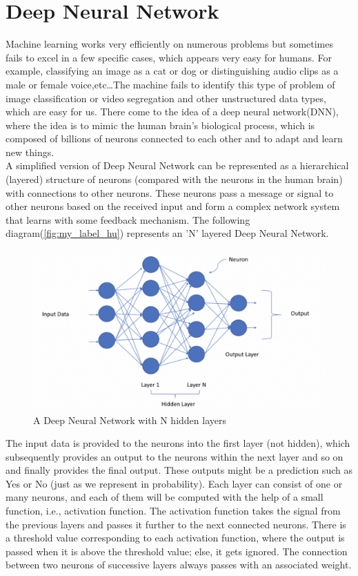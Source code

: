 \section{Deep Neural Network}
Machine learning works very efficiently on numerous problems but sometimes fails to excel in a few specific cases, which appears very easy for humans. For example, classifying an image as a cat or dog or distinguishing audio clips as a male or female voice,etc\dots The machine fails to identify this type of problem of image classification or video segregation and other unstructured data types, which are easy for us. There come to the idea of a deep neural network(DNN), where the idea is to mimic the human brain's biological process, which is composed of billions of neurons connected to each other and to adapt and learn new things\cite{LeCun2015}. \\ 


A simplified version of Deep Neural Network can be represented as a hierarchical (layered) structure of neurons (compared with the neurons in the human brain) with connections to other neurons. These neurons pass a message or signal to other neurons based on the received input and form a complex network system that learns with some feedback mechanism. The following diagram(\autoref{fig:my_label_hu}) represents an 'N' layered Deep Neural Network.\\

\begin{figure}[H]
    \centering
    \includegraphics[scale=0.4]{Figure/1_ML_report.png}
    \caption{A Deep Neural Network with N hidden layers}
    \label{fig:my_label_hu}
\end{figure}
The input data is provided to the neurons into the first layer (not hidden), which subsequently provides an output to the neurons within the next layer and so on and finally provides the final output. These outputs might be a prediction such as Yes or No (just as we represent in probability). Each layer can consist of one or many neurons, and each of them will be computed with the help of a small function, i.e., activation function. The activation function takes the signal from the previous layers and passes it further to the next connected neurons. There is a threshold value corresponding to each activation function, where the output is passed when it is above the threshold value; else, it gets ignored. The connection between two neurons of successive layers always passes with an associated weight. \\
 
